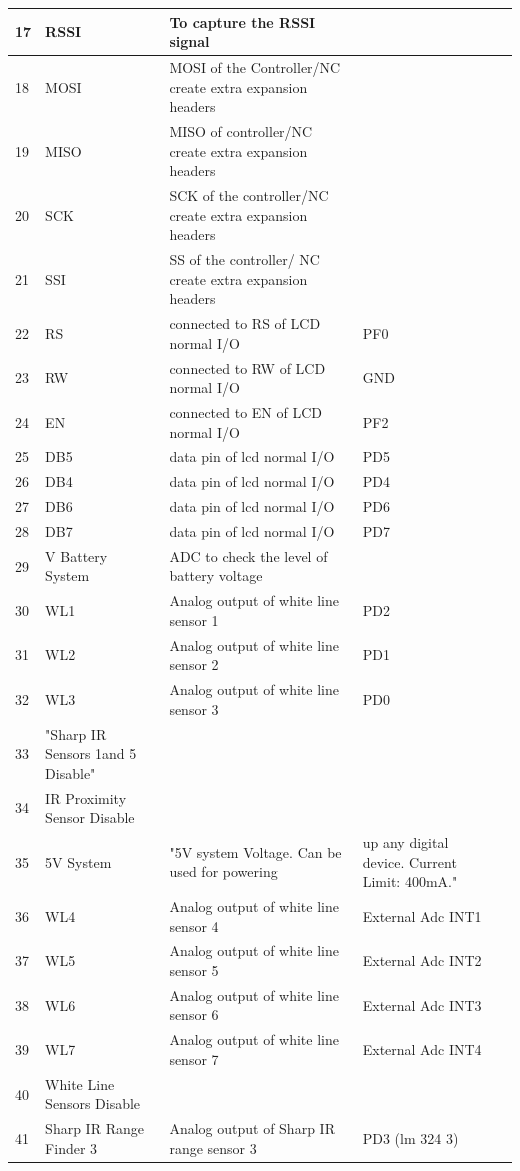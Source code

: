 \documentclass[a4paper,12pt,oneside]{article}
\begin{document}
{\begin{longtable}{|p{}|p{}|p{}|p{}|p{}|}
				17&	RSSI&	To capture the RSSI signal&\\ \hline	
				18&	MOSI&	MOSI of the Controller/NC create extra expansion headers&\\ \hline	
				19&	MISO&	MISO of controller/NC create extra expansion headers	&\\ \hline
				20&	SCK&	SCK of the controller/NC create extra expansion headers&	\\ \hline
				21&	SSI	&SS of the controller/ NC create extra expansion headers	&\\ \hline
				22&	RS&	connected to RS of LCD normal I/O&	PF0\\ \hline
				23&	RW&	connected to RW of LCD normal I/O&	GND\\ \hline
				24&	EN&	connected to EN of LCD normal I/O&	PF2\\ \hline
				25&	DB5	&data pin of lcd normal I/O	&PD5\\ \hline
				26&	DB4&	data pin of lcd normal I/O&	PD4\\ \hline
				27&	DB6	&data pin of lcd normal I/O	&PD6\\ \hline
				28&	DB7	&data pin of lcd normal I/O	&PD7\\ \hline
				29&	V Battery System&	ADC to check the level of battery voltage	&\\ \hline
				30&	WL1&	Analog output of white line sensor 1	&PD2\\ \hline
				31&	WL2&	Analog output of white line sensor 2&	PD1\\ \hline
				32&	WL3&	Analog output of white line sensor 3&	PD0\\ \hline
				33&	"Sharp IR Sensors 1and 5
				Disable"& &		\\ \hline
				34&	IR Proximity Sensor Disable& &	\\ \hline	
				35&	5V System&	"5V system Voltage. Can be used for powering&
				up any digital device. Current Limit: 400mA."\\ \hline
				36&	WL4&	Analog output of white line sensor 4&	External Adc INT1\\ \hline
				37&	WL5&	Analog output of white line sensor 5&	External Adc INT2\\ \hline
				38&	WL6&	Analog output of white line sensor 6	&External Adc INT3\\ \hline
				39&	WL7&	Analog output of white line sensor 7&	External Adc INT4\\ \hline
				40&	White Line Sensors Disable&&\\ \hline		
				41&	Sharp IR Range Finder 3&	Analog output of Sharp IR range sensor 3	&PD3 (lm 324 3)\\ \hline

\end{longtable}}
\end{document}
